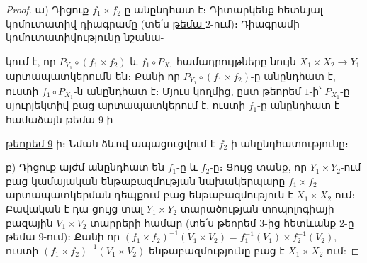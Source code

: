 \documentclass[./main.tex]{subfiles}
\begin{document}
\begin{proof}
ա) Դիցուք $f_1\times f_2$-ը անընդհատ է։ Դիտարկենք հետևյալ կոմու\-տա\-տիվ դիագրամը (տե՛ս \hyperlink{sec:2}{թեմա $2$}-ում)։ Դիագրամի կոմուտատիվությունը նշանա-
\begin{minipage}[b]{0.25\linewidth}
\end{minipage}%
\hspace{0.15\textwidth}
 \begin{minipage}{0.6\linewidth}
  կում է, որ $P_{Y_1}\circ (f_1\times f_2)$ և $f_1\circ P_{X_1}$ համադրույթները նույն $X_1\times X_2\rightarrow Y_1$ արտապատկերումն են։ Քանի որ $P_{Y_1}\circ (f_1\times f_2)$-ը անընդհատ է, ուստի $f_1\circ P_{X_1}$-ն անընդհատ է։ Մյուս կողմից, ըստ \hyperref[թեորեմ $1$]{թեորեմ $1$}-ի՝  $P_{X_1}\textrm{-ը}$ սյուրյեկտիվ բաց արտապատկերում է, ուստի $f_1$-ը անընդհատ է համաձայն թեմա 9-ի \linebreak
\end{minipage}\vspace*{-0.86em}
    \hyperref[ch9thm9]{թեորեմ 9}-ի։ Նման ձևով ապացուցվում է $f_2$-ի անընդհատությունը։

\par բ) Դիցուք այժմ անընդհատ են $f_1$-ը և $f_2$-ը։ Ցույց տանք, որ $Y_1\times Y_2$-ում բաց կամայական ենթաբազմության նախակերպարը $f_1\times f_2$ արտապատկերման դեպքում բաց ենթաբազմություն է $X_1\times X_2$-ում։ Բավական է դա ցույց տալ $Y_1\times Y_2$ տարա\-ծության տոպոլոգիայի բազային $V_1\times V_2$ տարրերի համար (տե՛ս \hyperref[ch9thm3]{թեորեմ 3}-ից \hyperref[ch9cor2]{հե\-տևանք 2}-ը թեմա 9-ում)։ Քանի որ ${(f_1\times f_2)^{-1}} (V_1\times V_2)=f_1^{-1} (V_1 )\times f_2^{-1} (V_2), $ ուստի $(f_1\times f_2)^{-1} (V_1\times V_2)$ ենթաբազմությունը բաց է $X_1\times X_2\textrm{-ում}$:
\end{proof}
\end{document}
